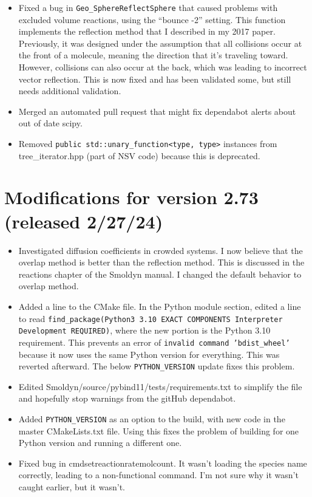 \documentclass {scrbook}
\newcommand {\ttt} {\texttt}
\begin{document}
\begin{itemize}
\item Fixed a bug in \ttt{Geo\_SphereReflectSphere} that caused problems with excluded volume reactions, using the ``bounce -2'' setting. This function implements the reflection method that I described in my 2017 paper. Previously, it was designed under the assumption that all collisions occur at the front of a molecule, meaning the direction that it's traveling toward. However, collisions can also occur at the back, which was leading to incorrect vector reflection. This is now fixed and has been validated some, but still needs additional validation.
\item Merged an automated pull request that might fix dependabot alerts about out of date scipy.
\item Removed \ttt{public std::unary\_function<type, type>} instances from tree\_iterator.hpp (part of NSV code) because this is deprecated.
\end{itemize}

\section{Modifications for version 2.73 (released 2/27/24)}
\begin{itemize}
\item Investigated diffusion coefficients in crowded systems. I now believe that the overlap method is better than the reflection method. This is discussed in the reactions chapter of the Smoldyn manual. I changed the default behavior to overlap method.
\item Added a line to the CMake file. In the Python module section, edited a line to read \ttt{find\_package(Python3 3.10 EXACT COMPONENTS Interpreter Development REQUIRED)}, where the new portion is the Python 3.10 requirement. This prevents an error of \ttt{invalid command 'bdist\_wheel'} because it now uses the same Python version for everything. This was reverted afterward. The below \ttt{PYTHON\_VERSION} update fixes this problem.
\item Edited Smoldyn/source/pybind11/tests/requirements.txt to simplify the file and hopefully stop warnings from the gitHub dependabot.
\item Added \ttt{PYTHON\_VERSION} as an option to the build, with new code in the master CMakeLists.txt file. Using this fixes the problem of building for one Python version and running a different one.
\item Fixed bug in cmdsetreactionratemolcount. It wasn't loading the species name correctly, leading to a non-functional command. I'm not sure why it wasn't caught earlier, but it wasn't.
\end{itemize}
\end{document}
